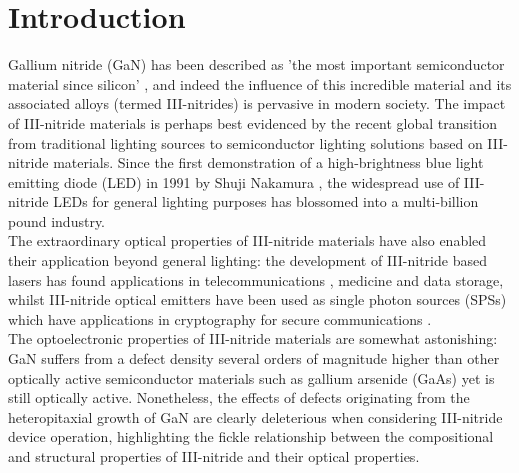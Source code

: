 
\chapter{Introduction}  %

\ifpdf
    \graphicspath{{Chapter1/Figs/Raster/}{Chapter1/Figs/PDF/}{Chapter1/Figs/}}
\else
    \graphicspath{{Chapter1/Figs/Vector/}{Chapter1/Figs/}}
\fi

Gallium nitride  (GaN) has been described as 'the most important semiconductor material since silicon' \cite{Humphreys2008}, and indeed the influence of this incredible material and its associated alloys (termed III-nitrides) is pervasive in modern society. The impact of III-nitride materials is perhaps best evidenced by the recent global transition from traditional lighting sources to semiconductor lighting solutions based on III-nitride materials. Since the first demonstration of a high-brightness blue light emitting diode  (LED) in 1991 by Shuji Nakamura \cite{Nakamura1991}, the widespread use of III-nitride LEDs for general lighting purposes has blossomed into a multi-billion pound industry.\\ The extraordinary optical properties of III-nitride materials have also enabled their application beyond general lighting: the development of III-nitride based lasers has found applications in telecommunications \cite{Najda2015}, medicine \cite{BerlienBreuerMuellerEtAl2012} and data storage, whilst III-nitride optical emitters have been used as single photon sources  (SPSs) which have applications in cryptography for secure communications \cite{Kako2006}.
\\The optoelectronic properties of III-nitride materials are somewhat astonishing: GaN suffers from a defect density several orders of magnitude higher than other optically active semiconductor materials such as gallium arsenide  (GaAs) \cite{Bennett2010b} yet is still optically active. Nonetheless, the effects of defects originating from the heteropitaxial growth of GaN are clearly deleterious when considering III-nitride device operation, highlighting the fickle relationship between the compositional and structural properties of III-nitride and their optical properties. 
